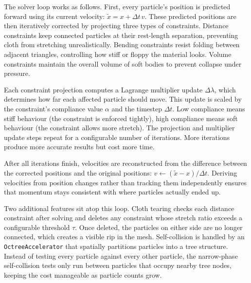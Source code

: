 \documentclass[9pt,openany]{extbook}
\begin{document}
The solver loop works as follows. First, every particle's position is predicted forward using its current velocity: $\tilde{x} = x + \Delta t\,v$. These predicted positions are then iteratively corrected by projecting three types of constraints. Distance constraints keep connected particles at their rest-length separation, preventing cloth from stretching unrealistically. Bending constraints resist folding between adjacent triangles, controlling how stiff or floppy the material looks. Volume constraints maintain the overall volume of soft bodies to prevent collapse under pressure.

Each constraint projection computes a Lagrange multiplier update $\Delta\lambda$, which determines how far each affected particle should move. This update is scaled by the constraint's compliance value $\alpha$ and the timestep $\Delta t$. Low compliance means stiff behaviour (the constraint is enforced tightly), high compliance means soft behaviour (the constraint allows more stretch). The projection and multiplier update steps repeat for a configurable number of iterations. More iterations produce more accurate results but cost more time.

After all iterations finish, velocities are reconstructed from the difference between the corrected positions and the original positions: $v \leftarrow (\tilde{x} - x) / \Delta t$. Deriving velocities from position changes rather than tracking them independently ensures that momentum stays consistent with where particles actually ended up.

Two additional features sit atop this loop. Cloth tearing checks each distance constraint after solving and deletes any constraint whose stretch ratio exceeds a configurable threshold $\tau$. Once deleted, the particles on either side are no longer connected, which creates a visible rip in the mesh. Self-collision is handled by an \texttt{OctreeAccelerator} that spatially partitions particles into a tree structure. Instead of testing every particle against every other particle, the narrow-phase self-collision tests only run between particles that occupy nearby tree nodes, keeping the cost manageable as particle counts grow.
\end{document}
